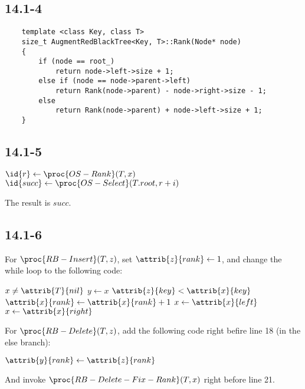 \subsection*{14.1-4}

\begin{verbatim}
    template <class Key, class T>
    size_t AugmentRedBlackTree<Key, T>::Rank(Node* node)
    {
        if (node == root_)
            return node->left->size + 1;
        else if (node == node->parent->left)
            return Rank(node->parent) - node->right->size - 1;
        else
            return Rank(node->parent) + node->left->size + 1;
    }
\end{verbatim}

\subsection*{14.1-5}

\begin{codebox}
    \li $\id{r} \gets \proc{OS-Rank}(T, x)$
    \li $\id{succ} \gets \proc{OS-Select}(T.root, r + i)$
\end{codebox}

The result is $succ$.

\subsection*{14.1-6}

\noindent
For $\proc{RB-Insert}(T, z)$,
set $\attrib{z}{rank} \gets 1$,
and change the while loop to the following code:

\begin{codebox}
    \li \While $x \neq \attrib{T}{nil}$
    \li \Do
            $y \gets x$
    \li     \If $\attrib{z}{key} < \attrib{x}{key}$
    \li     \Then
                $\attrib{x}{rank} \gets \attrib{x}{rank} + 1$
    \li         $x \gets \attrib{x}{left}$
    \li     \Else
                $x \gets \attrib{x}{right}$
            \End
        \End
\end{codebox}

\noindent
For $\proc{RB-Delete}(T, z)$,
add the following code right befire line 18 (in the else branch):

\begin{codebox}
    \zi $\attrib{y}{rank} \gets \attrib{z}{rank}$
\end{codebox}

\noindent
And invoke $\proc{RB-Delete-Fix-Rank}(T, x)$ right before line 21.


